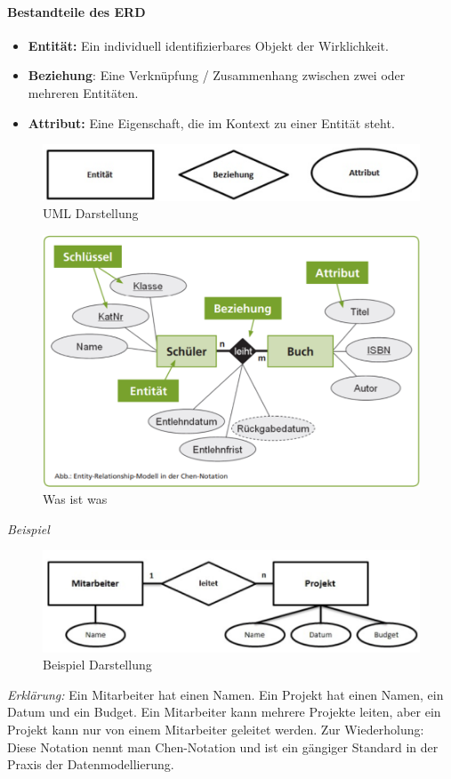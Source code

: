 \paragraph{Bestandteile des ERD}
\begin{itemize}
    \item \textbf{Entität:} Ein individuell identifizierbares Objekt der Wirklichkeit.
    \item \textbf{Beziehung}: Eine Verknüpfung / Zusammenhang zwischen zwei oder mehreren Entitäten.
    \item \textbf{Attribut:} Eine Eigenschaft, die im Kontext zu einer Entität steht.
\end{itemize}

\begin{figure}[H]
    \centering
    \includegraphics[width=.8\textwidth]{Content/images/modellierung/erd.png}
    \caption{UML Darstellung}
    \label{fig:modellierung:erd}
\end{figure}
\begin{figure}[H]
    \centering
    \includegraphics[width=.8\textwidth]{Content/images/modellierung/erde.png}
    \caption{Was ist was}
    \label{fig:modellierung:erde}
\end{figure}

\textit{Beispiel}

\begin{figure}[H]
    \centering
    \includegraphics[width=.8\textwidth]{Content/images/modellierung/bsp.png}
    \caption{Beispiel Darstellung}
    \label{fig:modellierung:bsp}
\end{figure}
\textit{Erklärung:}
Ein Mitarbeiter hat einen Namen. Ein Projekt hat einen Namen, ein Datum und ein Budget. Ein Mitarbeiter kann mehrere Projekte leiten, aber ein Projekt kann nur von einem Mitarbeiter geleitet werden. 
Zur Wiederholung: Diese Notation nennt man Chen-Notation und ist ein gängiger Standard in der Praxis der Datenmodellierung.

